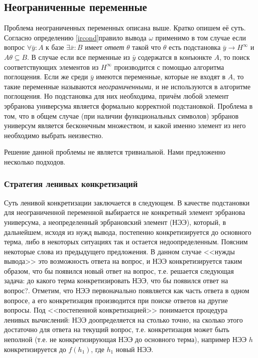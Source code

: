 \subsection{Неограниченные переменные}
Проблема неограниченных переменных описана выше. Кратко опишем её суть. Согласно определению \ref{ircond}правило вывода $\omega$ применимо в том случае если вопрос $\forall \bar{y}\colon A$ к базе $\exists \bar{x}\colon B$ имеет {\em ответ} $\theta$  такой что $\theta$ есть подстановка $\bar{y} \rightarrow H^{\infty}$ и $A\theta \subseteq B$. В случае если все перменные из $\bar{y}$ содержатся в конъюнкте $A$, то поиск соответствующих элементов из $H^{\infty}$ производится с помощью алгоритма поглощения. Если же среди $\bar{y}$ имеются переменные, которые не входят в $A$, то такие переменные называются \emph{неограниченными}, и не используются в алгоритме поглощения. Но подстановка для них необходима, причём любой элемент эрбранова универсума является формально корректной подстановкой. Проблема в том, что в общем случае (при наличии функциональных символов) эрбранов универсум является бесконечным множеством, и какой именно элемент из него необходимо выбрать неизвестно.

Решение данной проблемы не является тривиальной. Нами предложенно несколько подходов.

\subsubsection{Стратегия ленивых конкретизаций}
Суть ленивой конкретизации заключается в следующем. В качестве подстановки для неограниченной переменной выбирается не конкретный элемент эрбранова универсума, а неопределенный эрбрановский элемент (НЭЭ), который, в дальнейшем, исходя из нужд вывода, постепенно конкретизируется до основного терма, либо в некоторых ситуациях так и остается недоопределенным. Поясним некоторые слова из предыдущего предложения. В данном случае <<нужды вывода>> это возможность ответа на вопрос, и НЭЭ конкретизируется таким образом, что бы появился новый ответ на вопрос, т.е. решается следующая задача: до какого терма конкретизировать НЭЭ, что бы появился ответ на вопрос?. Отметим, что НЭЭ первоначально появляется как часть ответа в одном вопросе, а его конкретизация производится при поиске ответов на другие вопросы. Под <<постепенной конкретизацией>> понимается процедура ленивых вычислений: НЭЭ доопределяется на столько точно, на сколько этого достаточно для ответа на текущий вопрос, т.е. конкретизация может быть неполной (т.е. не конкретизирующая НЭЭ до основного терма), например НЭЭ $h$ конкретизируется до $f(h_1)$, где $h_1$ новый НЭЭ. 

